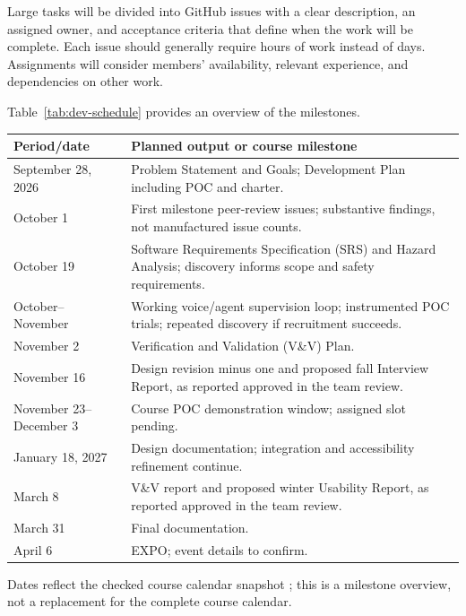 \documentclass[11pt]{article}
\begin{document}
Large tasks will be divided into GitHub issues with a clear description, an assigned owner,
and acceptance criteria that define when the work will be complete. Each issue should
generally require hours of work instead of days.
Assignments will consider members' availability, relevant experience, and dependencies on other work.

Table~\ref{tab:dev-schedule} provides an overview of the milestones.
\begin{center}
\begin{minipage}{\textwidth}
\label{tab:dev-schedule}
\begin{tabularx}{\textwidth}{>{\raggedright\arraybackslash}p{}X}
\toprule Period/date & Planned output or course milestone\\\midrule
September 28, 2026 & Problem Statement and Goals; Development Plan including POC and charter.\\
October 1 & First milestone peer-review issues; substantive findings, not manufactured issue counts.\\
October 19 & Software Requirements Specification (SRS) and Hazard Analysis; discovery informs scope and safety requirements.\\
October--November & Working voice/agent supervision loop; instrumented POC trials; repeated discovery if recruitment succeeds.\\
November 2 & Verification and Validation (V\&V) Plan.\\
November 16 & Design revision minus one and proposed fall Interview Report, as reported approved in the team review.\\
November 23--December 3 & Course POC demonstration window; assigned slot pending.\\
January 18, 2027 & Design documentation; integration and accessibility refinement continue.\\
March 8 & V\&V report and proposed winter Usability Report, as reported approved in the team review.\\
March 31 & Final documentation.\\
April 6 & EXPO; event details to confirm.\\\bottomrule
\end{tabularx}
\end{minipage}
\end{center}
Dates reflect the checked course calendar snapshot \citep{CourseCalendar}; this
is a milestone overview, not a replacement for the complete course calendar.
\end{document}
